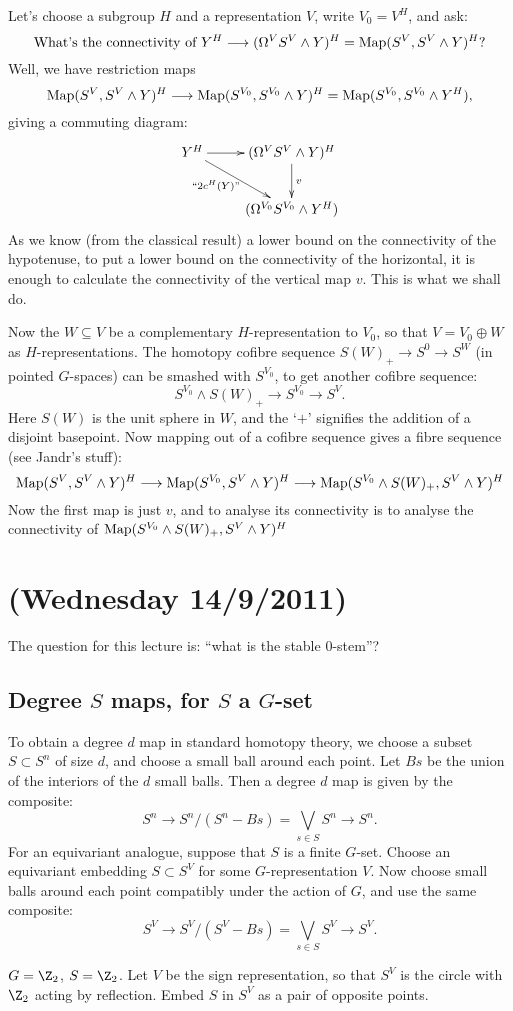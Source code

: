 \documentclass[11pt]{article}
\newcommand{\NewLecture}[3]{\section{#1 {\small(#2/#3/2011)}}}
\begin{document}
Let's choose a subgroup $H$ and a representation $V$, write $V_0=V^H$, and ask:
\[\text{What's the connectivity of }
Y^H\longrightarrow(\Omega^VS^V\wedge Y)^H=\operatorname{Map}(S^V,S^V\wedge Y)^H?\]
Well, we have restriction maps
\[\operatorname{Map}(S^V,S^V\wedge Y)^H\longrightarrow\operatorname{Map}(S^{V_0},S^{V_0}\wedge Y)^H=\operatorname{Map}(S^{V_0},S^{V_0}\wedge Y^H),\]
giving a commuting diagram:
\[\xymatrix{
Y^H\ar[r]\ar[dr]_(.4){\text{``$2c^H(Y)$''}}&(\Omega^VS^V\wedge Y)^H\ar[d]^v\\
&(\Omega^{V_0}S^{V_0}\wedge Y^H)
}\]
As we know (from the classical result) a lower bound on the connectivity of the hypotenuse, to put a lower bound on the connectivity of the horizontal, it is enough to calculate the connectivity of the vertical map $v$. This is what we shall do.

Now the $W\subseteq V$ be a complementary $H$-representation to $V_0$, so that $V=V_0\oplus W$ as $H$-representations. The homotopy cofibre sequence $S(W)_+\to S^0\to S^W$ (in pointed $G$-spaces) can be smashed with $S^{V_0}$, to get another cofibre sequence:
\[S^{V_0}\wedge S(W)_+\to S^{V_0}\to S^V.\]
Here $S(W)$ is the unit sphere in $W$, and the `$+$' signifies the addition of a disjoint basepoint. Now mapping out of a cofibre sequence gives a fibre sequence (see Jandr's stuff):
\[\operatorname{Map}(S^V,S^V\wedge Y)^H\longrightarrow\operatorname{Map}(S^{V_0},S^V\wedge Y)^H\longrightarrow \operatorname{Map}(S^{V_0}\wedge S(W)_+,S^V\wedge Y)^H\]
Now the first map is just $v$, and to analyse its connectivity is to analyse the connectivity of $\operatorname{Map}(S^{V_0}\wedge S(W)_+,S^V\wedge Y)^H$

\NewLecture{}{Wednesday 14}{9}
The question for this lecture is: ``what is the stable $0$-stem''?
\subsection*{Degree $S$ maps, for $S$ a $G$-set}
To obtain a degree $d$ map in standard homotopy theory, we choose a subset $S\subset S^n$ of size $d$, and choose a small ball around each point. Let $Bs$ be the union of the interiors of the $d$ small balls. Then a degree $d$ map is given by the composite:
\[S^n\to S^n/(S^n-Bs)=\textstyle{\bigvee}_{\!s\in S}S^n\to S^n.\]
For an equivariant analogue, suppose that $S$ is a finite $G$-set. Choose an equivariant embedding $S\subset S^V$ for some $G$-representation $V$. Now choose small balls around each point compatibly under the action of $G$, and use the same composite: 
\[S^V\to S^V/(S^V-Bs)=\textstyle{\bigvee}_{\!s\in S}S^V\to S^V.\]
\begin{exmp*}
$G=\Z_2$, $S=\Z_2$. Let $V$ be the sign representation, so that $S^V$ is the circle with $\Z_2$ acting by reflection. Embed $S$ in $S^V$ as a pair of opposite points.
\end{exmp*}
\end{document}
